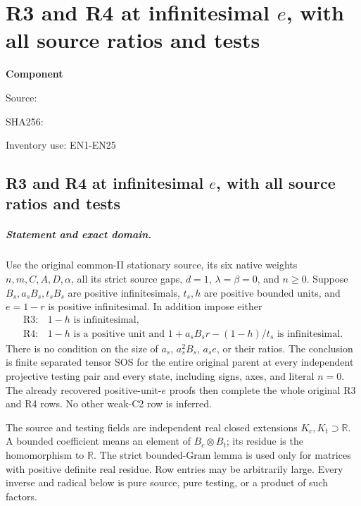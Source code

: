 \chapter{R3 and R4 at infinitesimal \(e\), with all source ratios and tests}
\label{component:p1de8b5ffab69}
\noindent\textbf{Component }\par
{\small\noindent Source: \par}
{\small\noindent SHA256: \par}
{\small\noindent Inventory use: EN1-EN25\par}
\medskip
\section{R3 and R4 at infinitesimal \(e\), with all source ratios and tests}
\label{p1de8b5ffab69:sec:new-r34-all-tests}

\paragraph{Statement and exact domain.}
Use the original common-II stationary source, its six native weights
$n,m,C,A,D,\alpha$, all its strict source gaps, $d=1$,
$\lambda=\beta=0$, and $n\geq0$. Suppose $B_s,a_sB_s,t_sB_s$
are positive infinitesimals, $t_s,h$ are positive bounded units,
and $e=1-r$ is positive infinitesimal. In addition impose either
\[
 \begin{array}{ll}
 \mathrm{R3}:&1-h\text{ is infinitesimal},\\
 \mathrm{R4}:&1-h\text{ is a positive unit and }
       1+a_sB_sr-(1-h)/t_s\text{ is infinitesimal}.
 \end{array}                                                    \tag{EN1}
\]
There is no condition on the size of $a_s$, $a_s^2B_s$,
$a_s e$, or their ratios. The conclusion is finite separated tensor
SOS for the entire original parent at every independent projective
testing pair and every state, including signs, axes, and literal $n=0$.
The already recovered positive-unit-$e$ proofs then complete the
whole original R3 and R4 rows. No other weak-C2 row is inferred.

The source and testing fields are independent real closed extensions
$K_c,K_t\supset\mathbb R$. A bounded coefficient means an element
of $B_c\otimes B_t$; its residue is the homomorphism to $\mathbb R$.
The strict bounded-Gram lemma is used only for matrices with positive
definite real residue. Row entries may be arbitrarily large.
Every inverse and radical below is pure source, pure testing, or a
product of such factors.

